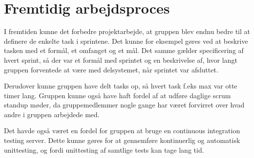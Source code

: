 \section{Fremtidig arbejdsproces}
I fremtiden kunne det forbedre projektarbejde, at gruppen blev endnu bedre til at definere de enkelte task i sprintene. Det kunne for eksempel gøres ved at beskrive tasken med et formål, et omfanget og et mål. Det samme gælder specificering af hvert sprint, så der var et formål med sprintet og en beskrivelse af, hvor langt gruppen forventede at være med delsystemet, når sprintet var afsluttet.

Derudover kunne gruppen have delt tasks op, så hvert task f.eks max var otte timer lang. Gruppen kunne også have haft fordel af at udføre daglige scrum standup møder, da gruppemedlemmer nogle gange har været forvirret over hvad andre i gruppen arbejdede med.

Det havde også været en fordel for gruppen at bruge en continuous integration testing server. Dette kunne gøres for at gennemføre kontinuerlig og automatisk unittesting, og fordi unittesting af samtlige tests kan tage lang tid.